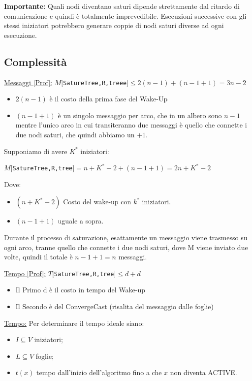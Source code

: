 \textbf{Importante:} Quali nodi diventano saturi dipende strettamente dal
ritardo di comunicazione e quindi è totalmente imprevedibile. Esecuzioni
successive con gli stessi iniziatori potrebbero generare coppie di nodi saturi
diverse ad ogni esecuzione.

\subsection{Complessità}
\underline{Messaggi [Prof]:}
$M[$\texttt{SatureTree,R,treee}$] \leq 2(n-1) + (n-1+1) = 3n - 2$
\begin{itemize}
    \item $2(n-1)$ è il costo della prima fase del Wake-Up
    \item $(n-1+1)$ è un singolo messaggio per arco, che in un albero sono $n-1$
          mentre l'unico arco in cui transiteranno due messaggi è quello che connette i
          due nodi saturi, che quindi abbiamo un $+1$.
\end{itemize}
Supponiamo di avere $K^*$ iniziatori:
\begin{center}
    $M[$\texttt{SatureTree,R,tree}$] = n + K^* - 2 + (n-1+1) = 2n + K^* -2$\\
\end{center}
Dove:
\begin{itemize}
    \item $(n + K^* - 2)$ Costo del wake-up con $k^*$ iniziatori.
    \item $(n-1+1)$ uguale a sopra.
\end{itemize}

Durante il processo di saturazione, esattamente un messaggio viene trasmesso su
ogni arco, tranne quello che connette i due nodi saturi, dove M viene inviato
due volte, quindi il totale è $n-1+1 = n$ messaggi.


\underline{Tempo [Prof]:}
$T[$\texttt{SatureTree,R,tree}$] \leq d + d$
\begin{itemize}
    \item Il Primo d è il costo in tempo del Wake-up
    \item Il Secondo è del ConvergeCast (risalita del messaggio dalle foglie)
\end{itemize}
\underline{Tempo:}
Per determinare il tempo ideale siano:
\begin{itemize}
    \item $I \subseteq V$ iniziatori;
    \item $L \subseteq V$ foglie;
    \item $t(x)$ tempo dall'inizio dell'algoritmo fino a che $x$ non diventa
          ACTIVE.
\end{itemize}

